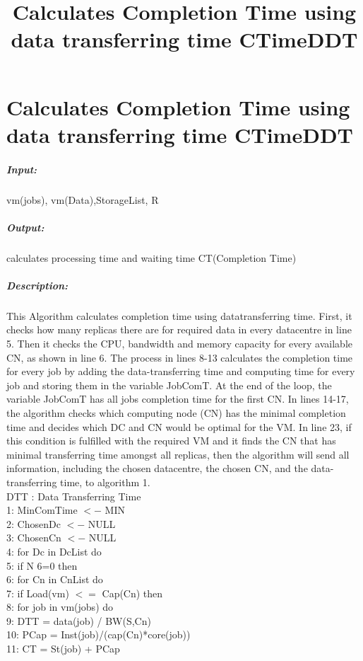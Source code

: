 \documentclass[12pt,a4paper]{report}
\begin{document}
\section{Calculates Completion Time using data transferring time CTimeDDT }
\title{ Calculates Completion Time using data transferring time CTimeDDT }
\subparagraph*{Input:} vm(jobs), vm(Data),StorageList, R
\subparagraph*{Output:} calculates processing time and waiting time CT(Completion Time)
\subparagraph*{Description:} This Algorithm calculates completion time using datatransferring time. First, it checks how many replicas there are for required data in every datacentre in line 5. Then it checks the CPU, bandwidth and memory capacity for every available CN, as shown in line 6. The process in lines 8-13 calculates the completion time for every job by adding the data-transferring time and computing time for every job and storing them in the variable JobComT. At the end of the loop, the variable JobComT has all jobs completion time for the ﬁrst CN. In lines 14-17, the algorithm checks which computing node (CN) has the minimal completion time and decides which DC and CN would be optimal for the VM. In line 23, if this condition is fulﬁlled with the required VM and it ﬁnds the CN that has minimal transferring time amongst all replicas, then the algorithm will send all information, including the chosen datacentre, the chosen CN, and the data-transferring time, to algorithm 1.\\
DTT : Data Transferring Time\\
1: MinComTime $<-$ MIN \\
2: ChosenDc $<-$ NULL \\
3: ChosenCn $<-$ NULL \\
4: for Dc in DcList do \\
5: \hspace{0.1 in}if N 6=0 then \\
6: \hspace{0.2 in}for Cn in CnList do \\
7: \hspace{0.3 in}if Load(vm) $<=$ Cap(Cn) then \\
8: \hspace{0.4 in}for job in vm(jobs) do \\
9: \hspace{0.4 in}DTT = data(job) / BW(S,Cn) \\
10: \hspace{0.4 in}PCap = Inst(job)/(cap(Cn)*core(job)) \\
11: \hspace{0.4 in}CT = St(job) + PCap \\
\end{document}

